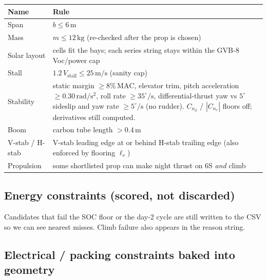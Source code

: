 \documentclass[11pt,letterpaper]{article}
\begin{document}
\begin{center}
\begin{tabular}{@{}lp{}@{}}
\toprule
Name & Rule \\
\midrule
Span & $b \le 6\,\mathrm{m}$ \\
Mass & $m \le 12\,\mathrm{kg}$ (re-checked after the prop is chosen) \\
Solar layout & cells fit the bays; each series string stays within the GVB-8 Voc/power cap \\
Stall & $1.2\,V_\mathrm{stall} \le 25\,\mathrm{m/s}$ (sanity cap) \\
Stability & static margin $\ge 8\%\,\mathrm{MAC}$, elevator trim, pitch acceleration $\ge 0.30\,\mathrm{rad/s^2}$, roll rate $\ge 35^\circ/\mathrm{s}$, differential-thrust yaw vs $5^\circ$ sideslip and yaw rate $\ge 5^\circ/\mathrm{s}$ (no rudder). $C_{n_\beta}$ / $|C_{n_r}|$ floors off; derivatives still computed. \\
Boom & carbon tube length $> 0.4\,\mathrm{m}$ \\
V-stab / H-stab & V-stab leading edge at or behind H-stab trailing edge (also enforced by flooring $\ell_v$) \\
Propulsion & some shortlisted prop can make night thrust on 6S \emph{and} climb \\
\bottomrule
\end{tabular}
\end{center}

\subsection{Energy constraints (scored, not discarded)}

Candidates that fail the SOC floor or the day-2 cycle are still written to the CSV so we can see nearest misses. Climb failure also appears in the reason string.

\subsection{Electrical / packing constraints baked into geometry}
\end{document}
